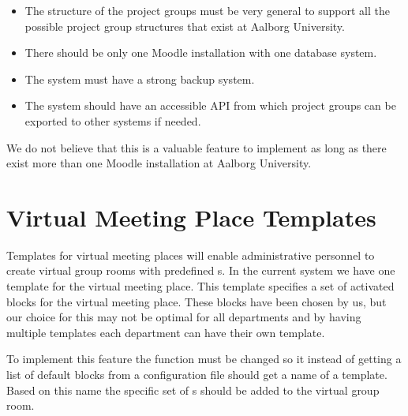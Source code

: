 \begin{itemize}
	\item The structure of the project groups must be very general to support all the possible project group structures that exist at Aalborg University. 
	\item There should be only one Moodle installation with one database system. 
	\item The system must have a strong backup system.
	\item The system should have an accessible API from which project groups can be exported to other systems if needed. 
\end{itemize}

We do not believe that this is a valuable feature to implement as long as there exist more than one Moodle installation at Aalborg University. 


\section{Virtual Meeting Place Templates} 
\label{sec:templates}
Templates for virtual meeting places will enable administrative personnel to create virtual group rooms with predefined \detdeandrelaver{}s.
In the current system we have one template for the virtual meeting place. 
This template specifies a set of activated blocks for the virtual meeting place. 
These blocks have been chosen by us, but our choice for this may not be optimal for all departments and by having multiple templates each department can have their own template.

To implement this feature the function  must be changed so it instead of getting a list of default blocks from a configuration file should get a name of a template.
Based on this name the specific set of \detdeandrelaver{}s should be added to the virtual group room.

